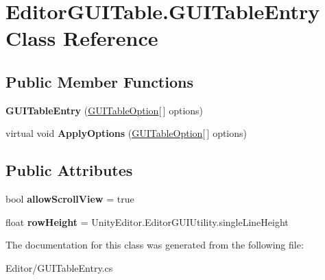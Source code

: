 \hypertarget{class_editor_g_u_i_table_1_1_g_u_i_table_entry}{}\section{Editor\+G\+U\+I\+Table.\+G\+U\+I\+Table\+Entry Class Reference}
\label{class_editor_g_u_i_table_1_1_g_u_i_table_entry}
\subsection*{Public Member Functions}
\begin{DoxyCompactItemize}
\item 
\mbox{\label{class_editor_g_u_i_table_1_1_g_u_i_table_entry_a54c8219bb9a9ffd82ee2e1d465218b6a}} 
{\bfseries G\+U\+I\+Table\+Entry} (\mbox{\hyperlink{class_editor_g_u_i_table_1_1_g_u_i_table_option}{G\+U\+I\+Table\+Option}}\mbox{[}$\,$\mbox{]} options)
\item 
\mbox{\label{class_editor_g_u_i_table_1_1_g_u_i_table_entry_a2cea5d7b31567e6ab2a9b7abb4199d87}} 
virtual void {\bfseries Apply\+Options} (\mbox{\hyperlink{class_editor_g_u_i_table_1_1_g_u_i_table_option}{G\+U\+I\+Table\+Option}}\mbox{[}$\,$\mbox{]} options)
\end{DoxyCompactItemize}
\subsection*{Public Attributes}
\begin{DoxyCompactItemize}
\item 
\mbox{\label{class_editor_g_u_i_table_1_1_g_u_i_table_entry_a05effff7e10bff686425949541c2fd3d}} 
bool {\bfseries allow\+Scroll\+View} = true
\item 
\mbox{\label{class_editor_g_u_i_table_1_1_g_u_i_table_entry_a3c4abaa7a9d84c7af19bee8ddac29f37}} 
float {\bfseries row\+Height} = Unity\+Editor.\+Editor\+G\+U\+I\+Utility.\+single\+Line\+Height
\end{DoxyCompactItemize}


The documentation for this class was generated from the following file\+:\begin{DoxyCompactItemize}
\item 
Editor/G\+U\+I\+Table\+Entry.\+cs\end{DoxyCompactItemize}
